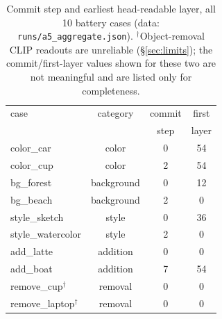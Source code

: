 \documentclass[10pt,twocolumn]{article}
\begin{document}
\begin{table}[t]
\centering
\small
\begin{tabular}{lccc}
\toprule
case & category & commit & first \\
 & & step & layer \\
\midrule
color\_car        & color         & 0 & 54 \\
color\_cup        & color         & 2 & 54 \\
bg\_forest        & background    & 0 & 12 \\
bg\_beach         & background    & 2 & 0  \\
style\_sketch     & style         & 0 & 36 \\
style\_watercolor & style         & 2 & 0  \\
add\_latte        & addition      & 0 & 0  \\
add\_boat         & addition      & 7 & 54 \\
remove\_cup$^\dagger$      & removal & 0 & 0 \\
remove\_laptop$^\dagger$   & removal & 0 & 0 \\
\bottomrule
\end{tabular}
\caption{Commit step and earliest head-readable layer, all 10 battery
cases (data: \texttt{runs/a5\_aggregate.json}). $^\dagger$Object-removal
CLIP readouts are unreliable (\S\ref{sec:limits}); the commit/first-layer
values shown for these two are not meaningful and are listed only for
completeness.}
\label{tab:battery}
\end{table}
\end{document}
